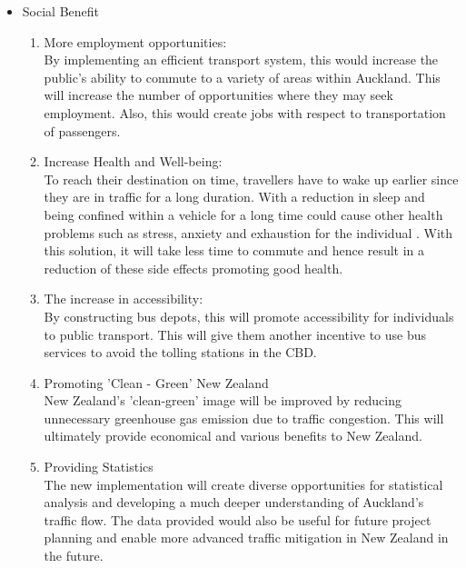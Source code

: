 \documentclass[twoside, a4paper, 11pt]{article}
\begin{document}
\begin{itemize}[leftmargin=0in]
\begin{enumerate}
\begin{enumerate}
\end{enumerate}
\end{enumerate}
\item Social Benefit
\begin{enumerate}
\item More employment opportunities:\\By implementing an efficient transport system, this would increase the public's ability to commute to a variety of areas within Auckland. This will increase the number of opportunities where they may seek employment. Also, this would create jobs with respect to transportation of passengers.
\item Increase Health and Well-being:\\To reach their destination on time, travellers have to wake up earlier since they are in traffic for a long duration. With a reduction in sleep and being confined within a vehicle for a long time could cause other health problems such as stress, anxiety and exhaustion for the individual \citep{kylstra14}. With this solution, it will take less time to commute and hence result in a reduction of these side effects promoting good health.
\item The increase in accessibility:\\By constructing bus depots, this will promote accessibility for individuals to public transport. This will give them another incentive to use bus services to avoid the tolling stations in the CBD.  
\item Promoting 'Clean - Green' New Zealand\\New Zealand's 'clean-green' image will be improved by reducing unnecessary greenhouse gas emission due to traffic congestion. This will ultimately provide economical and various benefits to New Zealand.
\item Providing Statistics\\The new implementation will create diverse opportunities for statistical analysis and developing a much deeper understanding of Auckland's traffic flow. The data provided would also be useful for  future project planning and enable more advanced traffic mitigation in New Zealand in the future.
\end{enumerate}
\end{itemize}
\end{document}
